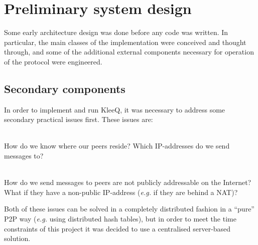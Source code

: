 \documentclass[a4paper, 12pt]{report}
\begin{document}
\section{Preliminary system design}
\label{sec:prep.design}
Some early architecture design was done before any code was written. In particular, the main classes of the implementation were conceived and thought through, and some of the additional external components necessary for operation of the protocol were engineered.
\subsection{Secondary components}
In order to implement and run KleeQ, it was necessary to address some secondary practical issues first. These issues are:
\begin{description}[labelindent=0.5cm, leftmargin=1.3cm, rightmargin=0.5cm]
    \item[Contact Discovery] \hfill \\
        How do we know where our peers reside? Which IP-addresses do we send messages to?
    \item[Transport] \hfill \\
        How do we send messages to peers are not publicly addressable on the Internet? What if they have a non-public IP-address (\textit{e.g.} if they are behind a NAT)?
\end{description}

Both of these issues can be solved in a completely distributed fashion in a ``pure'' P2P way (\textit{e.g.} using distributed hash tables), but in order to meet the time constraints of this project it was decided to use a centralised server-based solution. \\
\end{document}
